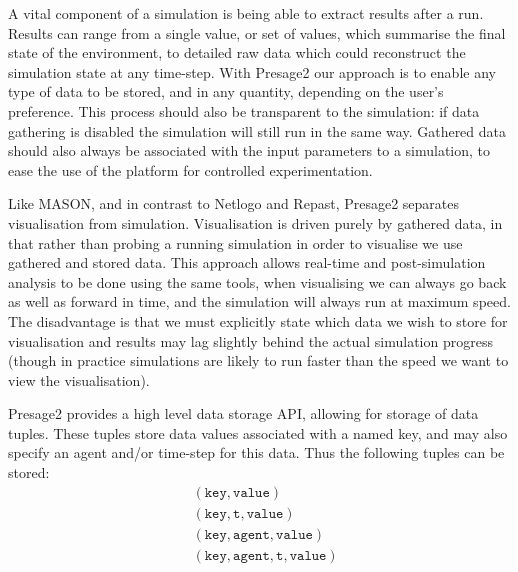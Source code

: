 A vital component of a simulation is being able to extract results after a run.
Results can range from a single value, or set of values, which summarise the final
state of the environment, to detailed raw data which could reconstruct the
simulation state at any time-step. With Presage2 our approach is to enable any
type of data to be stored, and in any quantity, depending on the user's
preference. This process should also be transparent to the simulation: if data
gathering is disabled the simulation will still run in the same way. Gathered
data should also always be associated with the input parameters to a simulation,
to ease the use of the platform for controlled experimentation.

Like MASON, and in contrast to Netlogo and Repast, Presage2 separates
visualisation from simulation. Visualisation is driven purely by gathered data,
in that rather than probing a running simulation in order to visualise we use
gathered and stored data. This approach allows real-time and post-simulation
analysis to be done using the same tools, when visualising we can always go back
as well as forward in time, and the simulation will always run at maximum speed.
The disadvantage is that we must explicitly state which data we wish to store
for visualisation and results may lag slightly behind the actual simulation
progress (though in practice simulations are likely to run faster than the speed
we want to view the visualisation).

Presage2 provides a high level data storage \ac{API}, allowing for storage of
data tuples. These tuples store data values associated with a named key, and may
also specify an agent and/or time-step for this data. Thus the following tuples
can be stored:
\begin{align*}
&(\mathtt{key},\mathtt{value})\\
&(\mathtt{key},\mathtt{t},\mathtt{value})\\
&(\mathtt{key},\mathtt{agent},\mathtt{value})\\
&(\mathtt{key},\mathtt{agent},\mathtt{t},\mathtt{value})
\end{align*}

